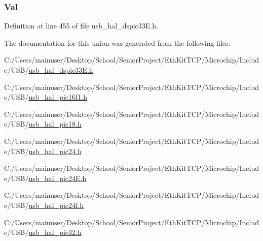 \hypertarget{union_____u_s_t_a_t_a5ab8c2bf45b20b5f7aa3a4f083896cec}{}
\subsubsection[{Val}]{ Val}\label{union_____u_s_t_a_t_a5ab8c2bf45b20b5f7aa3a4f083896cec}


Definition at line 455 of file usb\+\_\+hal\+\_\+dspic33\+E.\+h.



The documentation for this union was generated from the following files\+:\begin{DoxyCompactItemize}
\item 
C\+:/\+Users/mainuser/\+Desktop/\+School/\+Senior\+Project/\+Eth\+Kit\+T\+C\+P/\+Microchip/\+Include/\+U\+S\+B/\hyperlink{usb__hal__dspic33_e_8h}{usb\+\_\+hal\+\_\+dspic33\+E.\+h}\item 
C\+:/\+Users/mainuser/\+Desktop/\+School/\+Senior\+Project/\+Eth\+Kit\+T\+C\+P/\+Microchip/\+Include/\+U\+S\+B/\hyperlink{usb__hal__pic16f1_8h}{usb\+\_\+hal\+\_\+pic16f1.\+h}\item 
C\+:/\+Users/mainuser/\+Desktop/\+School/\+Senior\+Project/\+Eth\+Kit\+T\+C\+P/\+Microchip/\+Include/\+U\+S\+B/\hyperlink{usb__hal__pic18_8h}{usb\+\_\+hal\+\_\+pic18.\+h}\item 
C\+:/\+Users/mainuser/\+Desktop/\+School/\+Senior\+Project/\+Eth\+Kit\+T\+C\+P/\+Microchip/\+Include/\+U\+S\+B/\hyperlink{usb__hal__pic24_8h}{usb\+\_\+hal\+\_\+pic24.\+h}\item 
C\+:/\+Users/mainuser/\+Desktop/\+School/\+Senior\+Project/\+Eth\+Kit\+T\+C\+P/\+Microchip/\+Include/\+U\+S\+B/\hyperlink{usb__hal__pic24_e_8h}{usb\+\_\+hal\+\_\+pic24\+E.\+h}\item 
C\+:/\+Users/mainuser/\+Desktop/\+School/\+Senior\+Project/\+Eth\+Kit\+T\+C\+P/\+Microchip/\+Include/\+U\+S\+B/\hyperlink{usb__hal__pic24f_8h}{usb\+\_\+hal\+\_\+pic24f.\+h}\item 
C\+:/\+Users/mainuser/\+Desktop/\+School/\+Senior\+Project/\+Eth\+Kit\+T\+C\+P/\+Microchip/\+Include/\+U\+S\+B/\hyperlink{usb__hal__pic32_8h}{usb\+\_\+hal\+\_\+pic32.\+h}\end{DoxyCompactItemize}
